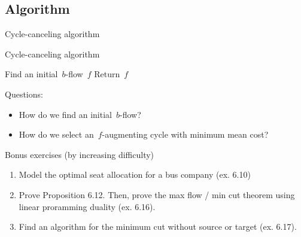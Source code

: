 \documentclass{beamer}
\begin{document}
\subsection{Algorithm}

\begin{frame}[t]{Cycle-canceling algorithm \citep{goldbergFindingMinimumcostCirculations1989}} \pause
  \setcounter{algocf}{4}
  \begin{algorithm}[H]
        \caption{Cycle-canceling algorithm}
   \SetAlgoLined \pause
     \pause
   Find an initial~$b$-flow~$f$\; \pause
    \pause
   Return~$f$
  \end{algorithm}
  \vfill \pause
  Questions: \pause
  \begin{itemize}
    \item How do we find an initial~$b$-flow? \pause
    \item How do we select an~$f$-augmenting cycle with minimum mean cost?
  \end{itemize}
\end{frame}




\begin{frame}{Bonus exercises (by increasing difficulty)} \pause
  \begin{enumerate}
    \item Model the optimal seat allocation for a bus company (ex. 6.10)
    \item Prove Proposition 6.12. Then, prove the max flow / min cut theorem using linear proramming duality (ex. 6.16).
    \item Find an algorithm for the minimum cut without source or target (ex. 6.17).
  \end{enumerate}
\end{frame}
\end{document}
